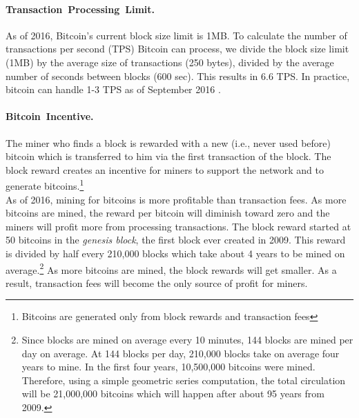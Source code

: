 \documentclass[11pt]{article}
\theoremstyle{mytheoremstyle}
\begin{document}
\paragraph{Transaction~Processing~Limit.} As of 2016, Bitcoin's current
block size limit is 1MB. To calculate the number of transactions per
second (TPS) Bitcoin can process, we divide the block size limit (1MB)
by the average size of transactions (250 bytes), divided by the average
number of seconds between blocks (600 sec). This results in 6.6 TPS.
In practice, bitcoin can handle 1-3 TPS as of September 2016 \cite{Blockchain:TransPerBlock}.

\paragraph{Bitcoin~Incentive.} The miner who finds a block is rewarded with
a new (i.e., never used before) bitcoin which is transferred to him
via the first transaction of the block. The block reward creates an
incentive for miners to support the network and to generate bitcoins.\footnote{Bitcoins are generated only from block rewards and transaction fees}\\
As of 2016, mining for bitcoins is more profitable than transaction
fees. As more bitcoins are mined, the reward per bitcoin will diminish
toward zero and the miners will profit more from processing transactions.
The block reward started at 50 bitcoins in the \emph{genesis block},
the first block ever created in 2009. This reward is divided by half
every 210,000 blocks which take about 4 years to be mined on average.\footnote{Since blocks are mined on average every 10 minutes, 144 blocks are
	mined per day on average. At 144 blocks per day, 210,000 blocks take
	on average four years to mine. In the first four years, 10,500,000
	bitcoins were mined. Therefore, using a simple geometric series computation,
	the total circulation will be 21,000,000 bitcoins which will happen
	after about 95 years from 2009. } As more bitcoins are mined, the block rewards will get smaller. As
a result, transaction fees will become the only source of profit for
miners.


\end{document}
